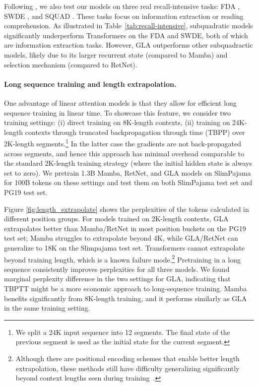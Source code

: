 Following \citet{Arora2024SimpleLA}, we also test our models on three real recall-intensive tasks: FDA \cite{arora_language_2023}, SWDE \cite{lockard_openceres_2019}, and SQUAD \cite{rajpurkar_know_2018}. These tasks focus on information extraction or reading comprehension. As illustrated in Table~\ref{tab:recall-intensive}, subquadratic models significantly underperform Transformers on the FDA and SWDE, both of which are information extraction tasks. However, GLA outperforms other subquadractic models, likely due to its larger recurrent state (compared to Mamba) and selection mechanism (compared to RetNet).


 

%
%

%
%
%


%


%

\vspace{-2mm}
\paragraph{Long sequence training and length extrapolation.} 
One advantage of linear attention models is that they allow for efficient long sequence training in linear time.
To showcase this feature, we consider two training settings: (i) direct training on 8K-length contexts, (ii) training on 24K-length contexts through {truncated backpropagation through time} (TBPP) over 2K-length segments.\footnote{We split a 24K input sequence into 12 segments. The final state of the previous segment is used as the initial state for the current segment.} In the latter case the gradients are not back-propagated across segments, and hence this approach has minimal overhead comparable to the standard 2K-length training strategy (where the initial hidden state is always set to zero). We pretrain 1.3B Mamba, RetNet, and GLA models on SlimPajama for 100B tokens on these settings and test them on both SlimPajama test set and PG19 \citep{pg19} test set. 

Figure \ref{fig:length_extrapolate} shows the perplexities of the tokens calculated in different position groups.  For models trained on 2K-length contexts, GLA extrapolates better than Mamba/RetNet in most position buckets on the PG19 test set; Mamba struggles to extrapolate beyond 4K, while GLA/RetNet can generalize to 18K on the Slimpajama test set.
%
Transformers cannot extrapolate beyond training length, which is a known failure mode.\footnote
{Although there are positional encoding schemes that enable better length extrapolation, these methods still have difficulty generalizing significantly beyond context lengths seen during training~\citep{alibi2021,xpos,fire2024}.} Pretraining in a long sequence consistently improves perplexities for all three models. We found marginal perplexity difference in the two settings for GLA, indicating that TBPTT might be a more economic approach to long-sequence training. Mamba benefits significantly from 8K-length training, and it performs similarly as GLA in the same training setting.
%
\vspace{-2mm}
